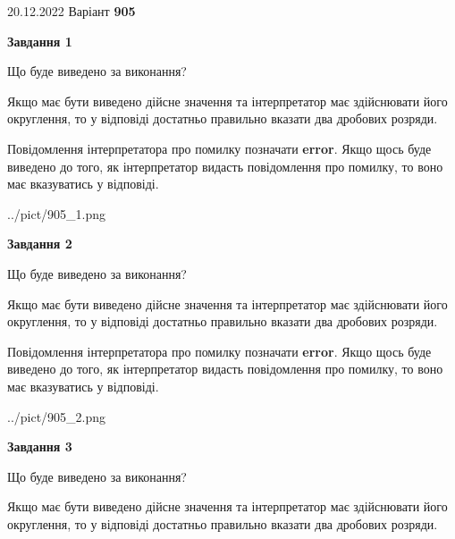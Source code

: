\documentclass[12pt, ukrainian]{article}
\begin{document}
{20.12.2022 Варіант \No \textbf { 905 }\par}
{
\begin {Large}

{\begin {center}\textbf{Завдання 1}\end {center}}\par
Що буде виведено за виконання? \par

Якщо має бути виведено дійсне значення та інтерпретатор має здійснювати його округлення, 
то у відповіді достатньо правильно вказати два дробових розряди.

Повідомлення інтерпретатора про помилку позначати \textbf{error}.
Якщо щось буде виведено до того, як інтерпретатор видасть повідомлення про помилку, 
то воно має вказуватись у відповіді. \par

\begin{center}
	{../pict/905_1.png}
\end{center}
\newpage

{\begin {center}\textbf{Завдання 2}\end {center}}\par
Що буде виведено за виконання? \par

Якщо має бути виведено дійсне значення та інтерпретатор має здійснювати його округлення, 
то у відповіді достатньо правильно вказати два дробових розряди.

Повідомлення інтерпретатора про помилку позначати \textbf{error}.
Якщо щось буде виведено до того, як інтерпретатор видасть повідомлення про помилку, 
то воно має вказуватись у відповіді. \par

\begin{center}
	{../pict/905_2.png}
\end{center}
\newpage

{\begin {center}\textbf{Завдання 3}\end {center}}\par
Що буде виведено за виконання? \par

Якщо має бути виведено дійсне значення та інтерпретатор має здійснювати його округлення, 
то у відповіді достатньо правильно вказати два дробових розряди.


\end{Large}}
\end{document}
